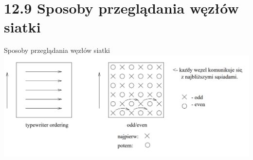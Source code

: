 \section{12.9 Sposoby przeglądania węzłów siatki}

\begin{frame}{Sposoby przeglądania węzłów siatki}
\includegraphics[height=0.6\textheight, width=1\textwidth]{img/12/iteracja3}
\end{frame}
